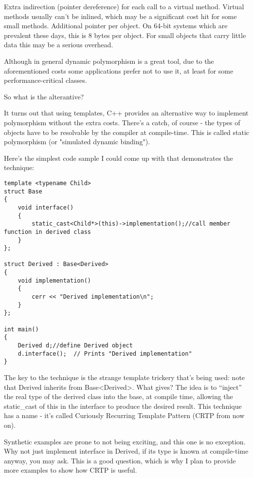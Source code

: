 \documentclass{book}
\begin{document}
    Extra indirection (pointer dereference) for each call to a virtual method.
    Virtual methods usually can't be inlined, which may be a significant cost hit for some small methods.
    Additional pointer per object. On 64-bit systems which are prevalent these days, this is 8 bytes per object. For small objects that carry little data this may be a serious overhead.

Although in general dynamic polymorphism is a great tool, due to the aforementioned costs some applications prefer not to use it, at least for some performance-critical classes. 

So what is the alterantive?

It turns out that using templates, C++ provides an alternative way to implement polymorphism without the extra costs.
There's a catch, of course - the types of objects have to be resolvable by the compiler at compile-time. This is called static polymorphism (or "simulated dynamic binding").

Here's the simplest code sample I could come up with that demonstrates the technique:

\begin{lstlisting}
template <typename Child>
struct Base
{
    void interface()
    {
        static_cast<Child*>(this)->implementation();//call member function in derived class
    }
};

struct Derived : Base<Derived>
{
    void implementation()
    {
        cerr << "Derived implementation\n";
    }
};

int main()
{
    Derived d;//define Derived object
    d.interface();  // Prints "Derived implementation"
}
\end{lstlisting}

The key to the technique is the strange template trickery that's being used: note that Derived inherits from Base<Derived>. 
What gives? The idea is to ``inject'' the real type of the derived class into the base, at compile time, allowing the static\_cast of this in the interface to produce the desired result. 
This technique has a name - it's called Curiously Recurring Template Pattern (CRTP from now on).

Synthetic examples are prone to not being exciting, and this one is no exception. 
Why not just implement interface in Derived, if its type is known at compile-time anyway, you may ask. 
This is a good question, which is why I plan to provide more examples to show how CRTP is useful.
\end{document}

